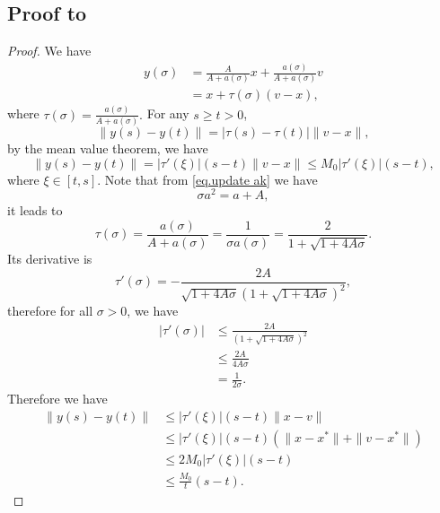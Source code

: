 \documentclass{mcom-l}
\numberwithin{equation}{section}
\begin{document}
\subsection*{Proof to }
\begin{proof}
    We have
    \begin{equation*}
        \begin{aligned}
            y(\sigma) & = \frac{A}{A+a(\sigma)}x+\frac{a(\sigma)}{A+a(\sigma)}v \\
                      & = x + \tau (\sigma) (v-x),
        \end{aligned}
    \end{equation*}
    where $\tau(\sigma) = \frac{a(\sigma)}{A+a(\sigma)}.$ For any $s\geq t>0$,
    \begin{equation*}
        \|y(s)-y(t)\| = \left|\tau(s)-\tau(t)\right| \|v-x\|,
    \end{equation*}
    by the mean value theorem, we have
    \begin{equation*}
        \|y(s)-y(t)\| = \left|\tau'(\xi)\right|(s-t) \|v-x\|\leq M_0\left|\tau'(\xi)\right|(s-t),
    \end{equation*}
    where $\xi \in \left[t,s\right]$. Note that from \eqref{eq.update ak} we have
    \begin{equation*}
        \sigma a^2=a+A,
    \end{equation*}
    it leads to
    \begin{equation*}
        \tau(\sigma) = \frac{a(\sigma)}{A+a(\sigma)} = \frac{1}{\sigma a(\sigma)} = \frac{2}{1+\sqrt{1+4A\sigma}}.
    \end{equation*}
    Its derivative is
    \begin{equation*}
        \tau'(\sigma) = -\frac{2A}{\sqrt{1+4A\sigma}\left(1+\sqrt{1+4A\sigma}\right)^2},
    \end{equation*}
    therefore for all $\sigma>0$, we have
    \begin{equation*}
        \begin{aligned}
            \left|\tau'(\sigma)\right| & \leq \frac{2A}{\left(1+\sqrt{1+4A\sigma}\right)^2} \\
                                       & \leq \frac{2A}{4A\sigma}                           \\
                                       & = \frac{1}{2\sigma}.
        \end{aligned}
    \end{equation*}
    Therefore we have
    \begin{equation*}
        \begin{aligned}
            \|y(s)-y(t)\| & \leq \left|\tau'(\xi)\right|(s-t)\|x-v\|                          \\
                          & \leq \left|\tau'(\xi)\right|(s-t)\left(\|x-x^*\|+\|v-x^*\|\right) \\
                          & \leq 2M_0\left|\tau'(\xi)\right|(s-t)                             \\
                          & \leq \frac{M_0}{t}(s-t).
        \end{aligned}
    \end{equation*}
\end{proof}
\end{document}
